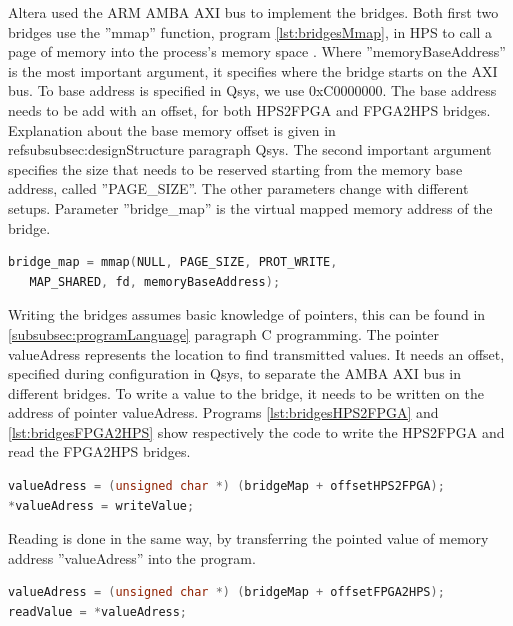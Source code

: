 \documentclass[12pt,a4paper,english,twoside,openright]{tutthesis}
\begin{document}
Altera used the ARM AMBA AXI bus to implement the bridges. Both first two bridges use the ''mmap'' function, program \ref{lst:bridgesMmap}, in HPS to call a page of memory into the process's memory space \cite{HPS2FPGAManual}. Where ''memoryBaseAddress'' is the most important argument, it specifies where the bridge starts on the AXI bus. To base address is specified in Qsys, we use 0xC0000000. The base address needs to be add with an offset, for both HPS2FPGA and FPGA2HPS bridges. Explanation about the base memory offset is given in ref{subsubsec:designStructure} paragraph Qsys. The second important argument specifies the size that needs to be reserved starting from the memory base address, called ''PAGE\_SIZE''. The other parameters change with different setups. Parameter ''bridge\_map'' is the virtual mapped memory address of the bridge.
\begin{lstlisting}[caption={mmap function},label={lst:bridgesMmap},language=C, float=h]
bridge_map = mmap(NULL, PAGE_SIZE, PROT_WRITE,
   MAP_SHARED, fd, memoryBaseAddress);
\end{lstlisting}
Writing the bridges assumes basic knowledge of pointers, this can be found in \ref{subsubsec:programLanguage} paragraph C programming. The pointer valueAdress represents the location to find transmitted values. It needs an offset, specified during configuration in Qsys, to separate the AMBA AXI bus in different bridges. To write a value to the bridge, it needs to be written on the address of pointer valueAdress. Programs \ref{lst:bridgesHPS2FPGA} and \ref{lst:bridgesFPGA2HPS} show respectively the code to write the HPS2FPGA and read the FPGA2HPS bridges.
\begin{lstlisting}[caption={HPS2FPGA, transmit over bridge},label={lst:bridgesHPS2FPGA},language=C, float=h]
valueAdress = (unsigned char *) (bridgeMap + offsetHPS2FPGA);
*valueAdress = writeValue;
\end{lstlisting}
Reading is done in the same way, by transferring the pointed value of memory address ''valueAdress'' into the program.
\begin{lstlisting}[caption={FPGA2HPS, receive over bridge},label={lst:bridgesFPGA2HPS},language=C, float=h]
valueAdress = (unsigned char *) (bridgeMap + offsetFPGA2HPS);
readValue = *valueAdress;
\end{lstlisting}
\end{document}
